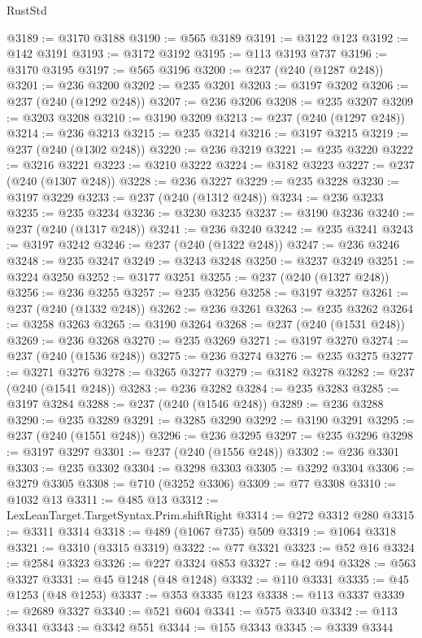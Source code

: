 \begin{lexlean}{RustStd}
\begin{coremodule}
@3189 := @3170 @3188
@3190 := @565 @3189
@3191 := @3122 @123
@3192 := @142 @3191
@3193 := @3172 @3192
@3195 := @113 @3193 @737
@3196 := @3170 @3195
@3197 := @565 @3196
@3200 := @237 (@240 (@1287 @248))
@3201 := @236 @3200
@3202 := @235 @3201
@3203 := @3197 @3202
@3206 := @237 (@240 (@1292 @248))
@3207 := @236 @3206
@3208 := @235 @3207
@3209 := @3203 @3208
@3210 := @3190 @3209
@3213 := @237 (@240 (@1297 @248))
@3214 := @236 @3213
@3215 := @235 @3214
@3216 := @3197 @3215
@3219 := @237 (@240 (@1302 @248))
@3220 := @236 @3219
@3221 := @235 @3220
@3222 := @3216 @3221
@3223 := @3210 @3222
@3224 := @3182 @3223
@3227 := @237 (@240 (@1307 @248))
@3228 := @236 @3227
@3229 := @235 @3228
@3230 := @3197 @3229
@3233 := @237 (@240 (@1312 @248))
@3234 := @236 @3233
@3235 := @235 @3234
@3236 := @3230 @3235
@3237 := @3190 @3236
@3240 := @237 (@240 (@1317 @248))
@3241 := @236 @3240
@3242 := @235 @3241
@3243 := @3197 @3242
@3246 := @237 (@240 (@1322 @248))
@3247 := @236 @3246
@3248 := @235 @3247
@3249 := @3243 @3248
@3250 := @3237 @3249
@3251 := @3224 @3250
@3252 := @3177 @3251
@3255 := @237 (@240 (@1327 @248))
@3256 := @236 @3255
@3257 := @235 @3256
@3258 := @3197 @3257
@3261 := @237 (@240 (@1332 @248))
@3262 := @236 @3261
@3263 := @235 @3262
@3264 := @3258 @3263
@3265 := @3190 @3264
@3268 := @237 (@240 (@1531 @248))
@3269 := @236 @3268
@3270 := @235 @3269
@3271 := @3197 @3270
@3274 := @237 (@240 (@1536 @248))
@3275 := @236 @3274
@3276 := @235 @3275
@3277 := @3271 @3276
@3278 := @3265 @3277
@3279 := @3182 @3278
@3282 := @237 (@240 (@1541 @248))
@3283 := @236 @3282
@3284 := @235 @3283
@3285 := @3197 @3284
@3288 := @237 (@240 (@1546 @248))
@3289 := @236 @3288
@3290 := @235 @3289
@3291 := @3285 @3290
@3292 := @3190 @3291
@3295 := @237 (@240 (@1551 @248))
@3296 := @236 @3295
@3297 := @235 @3296
@3298 := @3197 @3297
@3301 := @237 (@240 (@1556 @248))
@3302 := @236 @3301
@3303 := @235 @3302
@3304 := @3298 @3303
@3305 := @3292 @3304
@3306 := @3279 @3305
@3308 := @710 (@3252 @3306)
@3309 := @77 @3308
@3310 := @1032 @13
@3311 := @485 @13
@3312 := LexLeanTarget.TargetSyntax.Prim.shiftRight
@3314 := @272 @3312 @280
@3315 := @3311 @3314
@3318 := @489 (@1067 @735) @509
@3319 := @1064 @3318
@3321 := @3310 (@3315 @3319)
@3322 := @77 @3321
@3323 := @52 @16
@3324 := @2584 @3323
@3326 := @227 @3324 @853
@3327 := @42 @94
@3328 := @563 @3327
@3331 := @45 @1248 (@48 @1248)
@3332 := @110 @3331
@3335 := @45 @1253 (@48 @1253)
@3337 := @353 @3335 @123
@3338 := @113 @3337
@3339 := @2689 @3327
@3340 := @521 @604
@3341 := @575 @3340
@3342 := @113 @3341
@3343 := @3342 @551
@3344 := @155 @3343
@3345 := @3339 @3344

\end{coremodule}
\end{lexlean}
